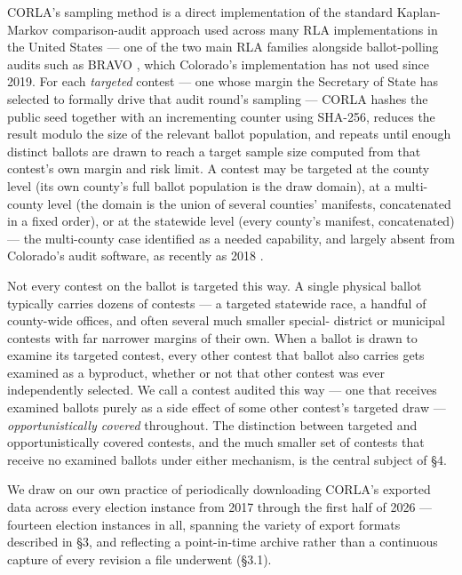 CORLA's sampling method is a direct implementation of the standard
Kaplan-Markov comparison-audit approach used across many RLA
implementations in the United States \cite{stark2008conservative,
lindeman2012gentle} — one of the two main RLA families alongside
ballot-polling audits such as BRAVO \cite{lindeman2012bravo}, which
Colorado's implementation has not used since 2019. For each \textit{targeted} contest — one
whose margin the Secretary of State has selected to formally drive that
audit round's sampling — CORLA hashes the public seed together with an
incrementing counter using SHA-256, reduces the result modulo the size of
the relevant ballot population, and repeats until enough distinct ballots
are drawn to reach a target sample size computed from that contest's own
margin and risk limit. A contest may be targeted at the county level (its
own county's full ballot population is the draw domain), at a multi-county
level (the domain is the union of several counties' manifests,
concatenated in a fixed order), or at the statewide level (every county's
manifest, concatenated) — the multi-county case identified as a needed
capability, and largely absent from Colorado's audit software, as
recently as 2018 \cite{lindeman2018nextsteps}.

Not every contest on the ballot is targeted this way. A single physical
ballot typically carries dozens of contests — a targeted statewide race, a
handful of county-wide offices, and often several much smaller special-
district or municipal contests with far narrower margins of their own. When
a ballot is drawn to examine its targeted contest, every other contest that
ballot also carries gets examined as a byproduct, whether or not that other
contest was ever independently selected. We call a contest
audited this way — one that receives examined ballots purely as a side
effect of some other contest's targeted draw — \textit{opportunistically covered}
throughout. The distinction between targeted and opportunistically covered
contests, and the much smaller set of contests that receive no examined
ballots under either mechanism, is the central subject of §4.

We draw on our own practice of periodically downloading CORLA's exported data across
every election instance from 2017 through the first half of 2026 — fourteen
election instances in all, spanning the variety of export formats
described in §3, and reflecting a point-in-time archive rather than a
continuous capture of every revision a file underwent (§3.1).


